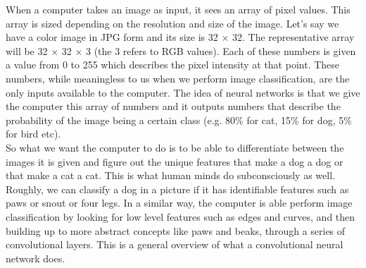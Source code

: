 \documentclass[12pt,a4paper,table,dvipsnames,tikz]{report}
\newcommand{\acronym}{\MakeUppercase}
\begin{document}
	When a computer takes an image as input, it sees an array of pixel values. This 
	array is sized depending on the resolution and size of the image. Let's say we 
	have a color image in \acronym{jpg} form and its size is 32 $\times$ 32. The 
	representative array will be 32 $\times$ 32 $\times$ 3 (the 3 refers to \acronym{rgb} 
	values). Each of these numbers is given a value from 0 to 255 which describes the 
	pixel intensity at that point. These numbers, while meaningless to us when we 
	perform image classification, are the only inputs available to the computer. The 
	idea of neural networks is that we give the computer this array of numbers and 
	it outputs numbers that describe the probability of the image being a certain 
	class (e.g. 80\% for cat, 15\% for dog, 5\% for bird etc).
	\\
	
	So what we want the computer to do is to be able to differentiate between the 
	images it is given and figure out the unique features that make a dog a dog or 
	that make a cat a cat. This is what human minds do subconsciously as well. Roughly,
	we can classify a dog in a picture if it has identifiable features such as paws or 
	snout or four legs. In a similar way, the computer is able perform image 
	classification by looking for low level features such as edges and curves, and 
	then building up to more abstract concepts like paws and beaks, through a series 
	of convolutional layers. This is a general overview of what a convolutional neural 
	network does.
	\\
	
\end{document}
